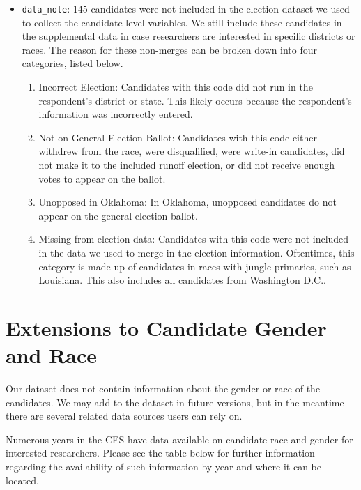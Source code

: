 \documentclass[12pt]{article}
\begin{document}
\begin{itemize}[leftmargin=*]
\item \texttt{data\_note}: 145 candidates were not included in the election dataset we used to collect the candidate-level variables. We still include these candidates in the supplemental data in case researchers are interested in specific districts or races. The reason for these non-merges can be broken down into four categories, listed below.
		\begin{enumerate}
			\item Incorrect Election: Candidates with this code  did not run in the respondent's district or state. This likely occurs because the respondent's information was incorrectly entered. 
			\item Not on General Election Ballot: Candidates with this code either withdrew from the race, were disqualified, were write-in candidates, did not make it to the included runoff election, or did not receive enough votes to appear on the ballot. 
			\item Unopposed in Oklahoma: In Oklahoma, unopposed candidates do not appear on the general election ballot. 
			\item Missing from election data: Candidates with this code were not included in the data we used to merge in the election information. Oftentimes, this category is made up of candidates in races with jungle primaries, such as Louisiana. This also includes all candidates from Washington D.C.. 
		\end{enumerate}
\end{itemize}
	




\section{Extensions to Candidate Gender and Race}
	
Our dataset does not contain information about the gender or race of the candidates. We may add to the dataset in future versions, but in the meantime there are several related data sources users can rely on.

Numerous years in the CES have data available on candidate race and gender for interested researchers. Please see the table below for further information regarding the availability of such information by year and where it can be located. 
\end{document}
